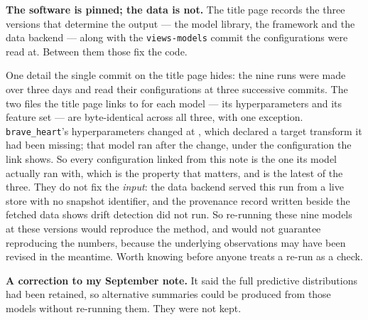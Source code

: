\textbf{The software is pinned; the data is not.} The title page records the three versions that
determine the output --- the model library, the framework and the data backend --- along with the
\texttt{views-models} commit the configurations were read at. Between them those fix the code.

One detail the single commit on the title page hides: the nine runs were made over three days
and read their configurations at three successive commits. The two files the title page links to
for each model --- its hyperparameters and its feature set --- are byte-identical across all
three, with one exception. \texttt{brave\_heart}'s hyperparameters changed at
\texttt{\deliverysha}, which declared a target transform it had been missing; that model ran
after the change, under the configuration the link shows. So every configuration linked from this
note is the one its model actually ran with, which is the property that matters, and
\texttt{\deliverysha} is the latest of the three.
They do not fix the \textit{input}: the data backend served this run from a live store with no
snapshot identifier, and the provenance record written beside the fetched data shows drift
detection did not run. So re-running these nine models at these versions would reproduce the
method, and would not guarantee reproducing the numbers, because the underlying observations may
have been revised in the meantime. Worth knowing before anyone treats a re-run as a check.

\textbf{A correction to my September note.} It said the full predictive distributions had been
retained, so alternative summaries could be produced from those models without re-running them.
They were not kept.
